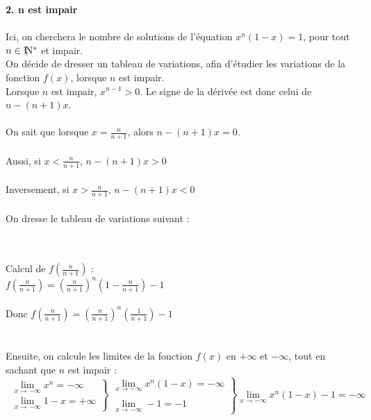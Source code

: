 \documentclass{article}
\begin{document}
\begin{exo2}
                     \textbf{\large{2. n est impair}} \\ \\
                     
                Ici, on cherchera le nombre de solutions de l'équation $x^{n}(1-x)=1$, pour tout $n\in{\rm I\!N^*}$ et impair. \\
                On décide de dresser un tableau de variations, afin d'étudier les variations de la fonction $f(x)$, lorsque $n$ est impair.\\
                Lorsque $n$ est impair, $x^{n-1}>0$. Le signe de la dérivée est donc celui de $n-(n+1)x$. \\ \\
                On sait que lorsque $x=\frac{n}{n+1}$, alors $n-(n+1)x=0$.\\ \\
                Aussi, si $x<\frac{n}{n+1}$, $n-(n+1)x>0 $ \\ \\
                Inversement, si $x>\frac{n}{n+1}$, $n-(n+1)x<0 $ \\ \\
                On dresse le tableau de variations suivant : \\
                
                
           \\ \\           
        Calcul de $f(\frac{n}{n+1})$ : \\
        
        $f(\frac{n}{n+1}) = (\frac{n}{n+1})^{n}(1-\frac{n}{n+1})-1$ \\ \\
        Donc $f(\frac{n}{n+1}) = (\frac{n}{n+1})^{n}(\frac{1}{n+1})-1$ \\ \\  \\    
        Ensuite, on calcule les limites de la fonction $f(x)$ en $+\infty$ et $-\infty$, tout en sachant que $n$ est impair :
    \[\
     \left.
        \begin{array}{ll}
            \lim\limits_{x \rightarrow -\infty} x^{n} = -\infty \\
            \lim\limits_{x \rightarrow -\infty} 1-x = +\infty
        \end{array}
    \right \} \left.
        \begin{array}{ll}
        \lim\limits_{x \rightarrow -\infty} x^{n}(1-x) = -\infty \\ \\
            \lim\limits_{x \rightarrow -\infty} -1 = -1 
        \end{array}
    \right \}\lim\limits_{x \rightarrow -\infty} x^{n}(1-x) -1 = -\infty
    \]
    

\end{exo2}
\end{document}
